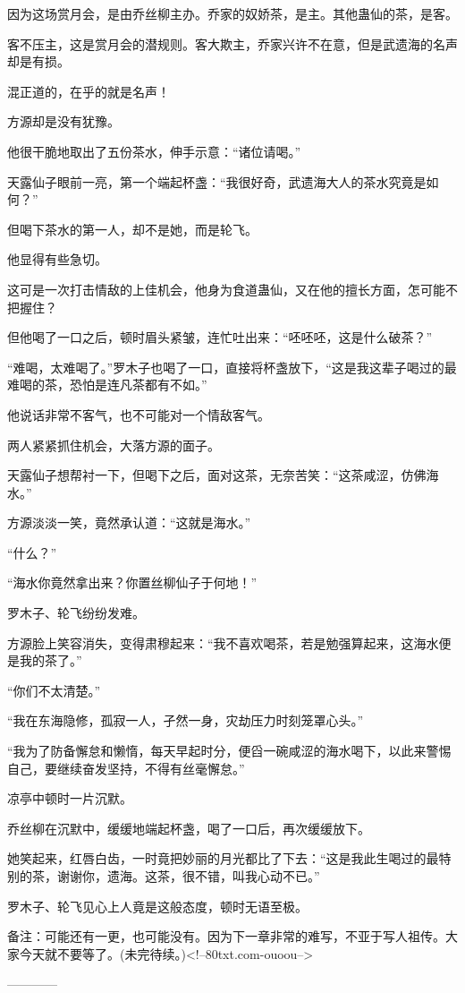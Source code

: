 \begin{this_body}
因为这场赏月会，是由乔丝柳主办。乔家的奴娇茶，是主。其他蛊仙的茶，是客。

客不压主，这是赏月会的潜规则。客大欺主，乔家兴许不在意，但是武遗海的名声却是有损。

混正道的，在乎的就是名声！

方源却是没有犹豫。

他很干脆地取出了五份茶水，伸手示意：“诸位请喝。”

天露仙子眼前一亮，第一个端起杯盏：“我很好奇，武遗海大人的茶水究竟是如何？”

但喝下茶水的第一人，却不是她，而是轮飞。

他显得有些急切。

这可是一次打击情敌的上佳机会，他身为食道蛊仙，又在他的擅长方面，怎可能不把握住？

但他喝了一口之后，顿时眉头紧皱，连忙吐出来：“呸呸呸，这是什么破茶？”

“难喝，太难喝了。”罗木子也喝了一口，直接将杯盏放下，“这是我这辈子喝过的最难喝的茶，恐怕是连凡茶都有不如。”

他说话非常不客气，也不可能对一个情敌客气。

两人紧紧抓住机会，大落方源的面子。

天露仙子想帮衬一下，但喝下之后，面对这茶，无奈苦笑：“这茶咸涩，仿佛海水。”

方源淡淡一笑，竟然承认道：“这就是海水。”

“什么？”

“海水你竟然拿出来？你置丝柳仙子于何地！”

罗木子、轮飞纷纷发难。

方源脸上笑容消失，变得肃穆起来：“我不喜欢喝茶，若是勉强算起来，这海水便是我的茶了。”

“你们不太清楚。”

“我在东海隐修，孤寂一人，孑然一身，灾劫压力时刻笼罩心头。”

“我为了防备懈怠和懒惰，每天早起时分，便舀一碗咸涩的海水喝下，以此来警惕自己，要继续奋发坚持，不得有丝毫懈怠。”

凉亭中顿时一片沉默。

乔丝柳在沉默中，缓缓地端起杯盏，喝了一口后，再次缓缓放下。

她笑起来，红唇白齿，一时竟把妙丽的月光都比了下去：“这是我此生喝过的最特别的茶，谢谢你，遗海。这茶，很不错，叫我心动不已。”

罗木子、轮飞见心上人竟是这般态度，顿时无语至极。

备注：可能还有一更，也可能没有。因为下一章非常的难写，不亚于写人祖传。大家今天就不要等了。(未完待续。)<!--80txt.com-ouoou-->

------------

\end{this_body}

